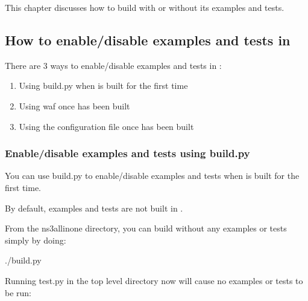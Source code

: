 \documentclass[letterpaper,10pt,english]{sphinxmanual}
\begin{document}
This chapter discusses how to build  with or without its examples and tests.


\subsection{How to enable/disable examples and tests in }
\label{\detokenize{enable-tests:how-to-enable-disable-examples-and-tests-in-ns3}}
There are 3 ways to enable/disable examples and tests in :
\begin{enumerate}
%
\item {} 
Using build.py when  is built for the first time

\item {} 
Using waf once  has been built

\item {} 
Using the  configuration file once  has been built

\end{enumerate}


\subsubsection{Enable/disable examples and tests using build.py}
\label{\detokenize{enable-tests:enable-disable-examples-and-tests-using-build-py}}
You can use build.py to enable/disable examples and tests when  is built for the first time.

By default, examples and tests are not built in .

From the ns\sphinxhyphen{}3\sphinxhyphen{}allinone directory, you can build  without any
examples or tests simply by doing:

\begin{sphinxVerbatim}[commandchars=\\\{\}]
\PYGZdl{} ./build.py
\end{sphinxVerbatim}

Running test.py in the top level  directory now will cause no examples or tests to be run:
\end{document}

